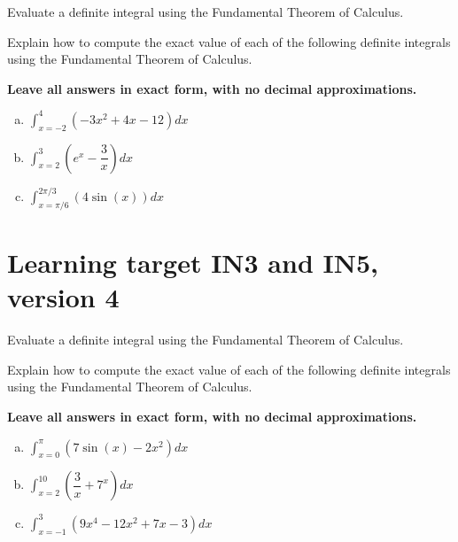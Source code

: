 Evaluate a definite integral using the Fundamental Theorem of Calculus.

\hrulefill


Explain how to compute the exact value of each of the following definite integrals using the Fundamental Theorem of Calculus. 

\textbf{Leave all answers in exact form, with no decimal approximations. }

\begin{enumerate}[(a)]
\item
\(\displaystyle \int_{x= -2 }^{ 4 } \left( -3x^2 + 4x - 12\right) dx\)
\vfill
\item 
\(\displaystyle \int_{ x=2 }^{ 3 } \left( e^x - \dfrac{3}{x}\right) dx\) 
\vfill
\item
\(\displaystyle \int_{x=\pi/6}^{2\pi/3} \left( 4\sin(x) \right) dx\)
\vfill

\end{enumerate}
\pagebreak
\section{Learning target IN3 and IN5, version 4} 

Evaluate a definite integral using the Fundamental Theorem of Calculus.

\hrulefill


Explain how to compute the exact value of each of the following definite integrals using the Fundamental Theorem of Calculus. 

\textbf{Leave all answers in exact form, with no decimal approximations. }

\begin{enumerate}[(a)]
\item
\(\displaystyle \int_{x= 0 }^{ \pi } \left( 7\sin(x) - 2x^2\right) dx\)
\vfill
\item 
\(\displaystyle \int_{ x=2 }^{ 10 } \left( \dfrac{3}{x} + 7^x\right) dx\) 
\vfill
\item
\(\displaystyle \int_{x=-1}^{3} \left(9x^4-12x^2+7x-3 \right) dx\)
\vfill

\end{enumerate}
\pagebreak

